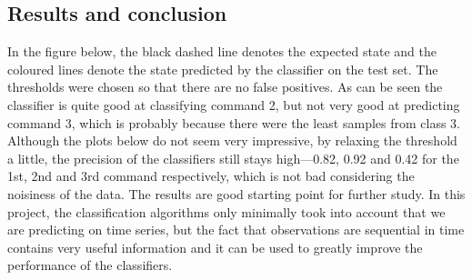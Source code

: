\documentclass[final]{beamer}
\begin{document}
\begin{poster}
\section{Results and conclusion}
\justify
In the figure below, the black dashed line denotes the expected state and the coloured lines denote the state predicted by the classifier on the test set. The thresholds were chosen so that there are no false positives. As can be seen the classifier is quite good at classifying command 2, but not very good at predicting command 3, which is probably because there were the least samples from class 3. Although the plots below do not seem very impressive, by relaxing the threshold a little, the precision of the classifiers still stays high---0.82, 0.92 and 0.42 for the 1st, 2nd and 3rd command respectively, which is not bad considering the noisiness of the data. The results are good starting point for further study. In this project, the classification algorithms only minimally took into account that we are predicting on time series, but the fact that observations are sequential in time contains very useful information and it can be used to greatly improve the performance of the classifiers.





\end{poster}
\end{document}
